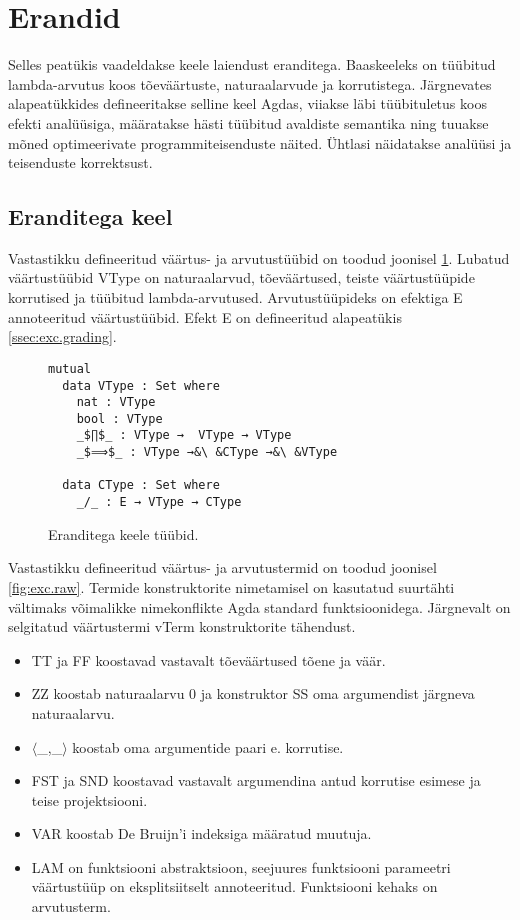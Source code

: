 \documentclass[a4paper,12pt]{article}
\begin{document}
\clearpage

\section{Erandid}

Selles peatükis vaadeldakse keele laiendust eranditega. 
Baaskeeleks on tüübitud lambda-arvutus koos tõeväärtuste, naturaalarvude ja korrutistega.
Järgnevates alapeatükkides defineeritakse selline keel Agdas,
viiakse läbi tüübituletus koos efekti analüüsiga,
määratakse hästi tüübitud avaldiste semantika
ning tuuakse mõned optimeerivate programmiteisenduste näited.
Ühtlasi näidatakse analüüsi ja teisenduste korrektsust.

\subsection{Eranditega keel}

Vastastikku defineeritud väärtus- ja arvutustüübid on toodud joonisel \ref{fig:exc.types}.
Lubatud väärtustüübid VType on naturaalarvud, tõeväärtused, teiste väärtustüüpide korrutised ja tüübitud lambda-arvutused.
Arvutustüüpideks on efektiga E annoteeritud väärtustüübid. Efekt E on defineeritud alapeatükis \ref{ssec:exc.grading}.
\begin{figure}
  \begin{lstlisting}
mutual
  data VType : Set where
    nat : VType
    bool : VType
    _$∏$_ : VType →  VType → VType
    _$⟹$_ : VType →&\ &CType →&\ &VType

  data CType : Set where
    _/_ : E → VType → CType
  \end{lstlisting}
  \caption{Eranditega keele tüübid.}
  \label{fig:exc.types}
\end{figure}


Vastastikku defineeritud väärtus- ja arvutustermid on toodud joonisel \ref{fig:exc.raw}.
Termide konstruktorite nimetamisel on kasutatud suurtähti vältimaks võimalikke nimekonflikte Agda standard funktsioonidega.
Järgnevalt on selgitatud väärtustermi vTerm konstruktorite tähendust.
\begin{itemize}
  \item TT ja FF koostavad vastavalt tõeväärtused tõene ja väär.
  \item ZZ koostab naturaalarvu 0 ja konstruktor SS oma argumendist järgneva naturaalarvu.
  \item $⟨$_,_$⟩$ koostab oma argumentide paari e. korrutise.
  \item FST ja SND koostavad vastavalt argumendina antud korrutise esimese ja teise projektsiooni.
  \item VAR koostab De Bruijn'i indeksiga määratud muutuja.
  \item LAM on funktsiooni abstraktsioon, seejuures funktsiooni parameetri väärtustüüp on eksplitsiitselt annoteeritud. Funktsiooni kehaks on arvutusterm.
\end{itemize}
\end{document}
